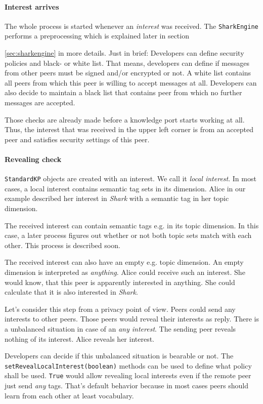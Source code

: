 \paragraph{Interest arrives}
The whole process is started whenever an {\it interest} was received. The {\tt SharkEngine} performs a preprocessing which is explained later in section {\ref{sec:sharkengine} in more details. Just in brief: Developers can define security policies and black- or white list. That means, developers can define if messages from other peers must be signed and/or encrypted or not. A white list contains all peers from which this peer is willing to accept messages at all. Developers can also decide to maintain a black list that contains peer from which no further messages are accepted.

Those checks are already made before a knowledge port starts working at all.
Thus, the interest that was received in the upper left corner is from an accepted peer and satisfies security settings of this peer.

\paragraph{Revealing check}
{\tt StandardKP} objects are created with an interest. We call it
{\it local interest}.
In most cases, a local interest contains semantic tag sets in its dimension. Alice in our example described her interest in {\it Shark} with a semantic tag in her topic dimension.

The received interest can contain semantic tags e.g. in its topic dimension. In this case, a later process figures out whether or not both topic sets match with each other. This process is described soon.

The received interest can also have an empty e.g. topic dimension. An empty dimension is interpreted as {\it anything}. Alice could receive such an interest. She would know, that this peer is apparently interested in anything. She could calculate that it is also interested in {\it Shark}.

Let's consider this step from a privacy point of view. Peers could send any interests to other peers. Those peers would reveal their interests as reply. There is a unbalanced situation in case of an {\it any interest}. The sending peer reveals nothing of its interest. Alice reveals her interest.

Developers can decide if this unbalanced situation is bearable or not. The {\tt setRevealLocalInterest(boolean)} methods can be used to define what policy shall be used. {\tt True} would allow revealing local interests even if the remote peer just send {\it any} tags. That's default behavior because in most cases peers should learn from each other at least vocabulary.

}
